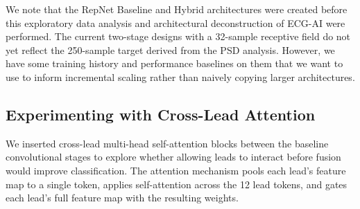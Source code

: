 \documentclass[sigconf,nonacm]{acmart}
\begin{document}
We note that the RepNet Baseline and Hybrid architectures were created before this exploratory data analysis and architectural deconstruction of ECG-AI were performed. The current two-stage designs with a 32-sample receptive field do not yet reflect the 250-sample target derived from the PSD analysis. However, we have some training history and performance baselines on them that we want to use to inform incremental scaling rather than naively copying larger architectures.

\subsection{Experimenting with Cross-Lead Attention}

We inserted cross-lead multi-head self-attention blocks between the baseline convolutional stages to explore whether allowing leads to interact before fusion would improve classification. The attention mechanism pools each lead's feature map to a single token, applies self-attention across the 12 lead tokens, and gates each lead's full feature map with the resulting weights.
\end{document}
